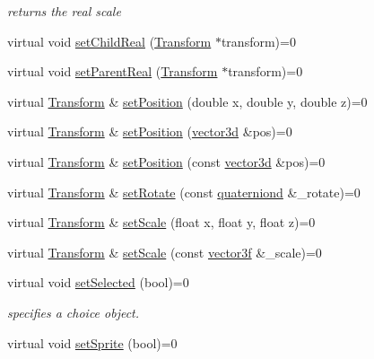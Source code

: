 \begin{DoxyCompactItemize}
\begin{DoxyCompactList}\small\item\em returns the real scale \end{DoxyCompactList}\item 
virtual void \hyperlink{classcsad_1_1_transform_a5fce29724a5e26c3fab77c2546957f9a}{set\-Child\-Real} (\hyperlink{classcsad_1_1_transform}{Transform} $\ast$transform)=0
\item 
virtual void \hyperlink{classcsad_1_1_transform_a4931301d16d9cd801bdfc14c2b0b9dd7}{set\-Parent\-Real} (\hyperlink{classcsad_1_1_transform}{Transform} $\ast$transform)=0
\item 
virtual \hyperlink{classcsad_1_1_transform}{Transform} \& \hyperlink{classcsad_1_1_transform_a8c0308fb4a1103cb8a263edb3d056346}{set\-Position} (double x, double y, double z)=0
\item 
virtual \hyperlink{classcsad_1_1_transform}{Transform} \& \hyperlink{classcsad_1_1_transform_acae94f7cc01c1624c1b92b23038ff73a}{set\-Position} (\hyperlink{classbt_1_1vector3d}{vector3d} \&pos)=0
\item 
virtual \hyperlink{classcsad_1_1_transform}{Transform} \& \hyperlink{classcsad_1_1_transform_af4dfd9ed7eeb7047080f4d3e7bc09bdb}{set\-Position} (const \hyperlink{classbt_1_1vector3d}{vector3d} \&pos)=0
\item 
virtual \hyperlink{classcsad_1_1_transform}{Transform} \& \hyperlink{classcsad_1_1_transform_af7804a2ba14b15d241049156123bd49f}{set\-Rotate} (const \hyperlink{classbt_1_1quaterniond}{quaterniond} \&\-\_\-rotate)=0
\item 
virtual \hyperlink{classcsad_1_1_transform}{Transform} \& \hyperlink{classcsad_1_1_transform_ab6dec9e170dbbea0fae84ff439546e54}{set\-Scale} (float x, float y, float z)=0
\item 
virtual \hyperlink{classcsad_1_1_transform}{Transform} \& \hyperlink{classcsad_1_1_transform_a068d783bb86fa953143a6fb0b4ef95a1}{set\-Scale} (const \hyperlink{classbt_1_1vector3f}{vector3f} \&\-\_\-scale)=0
\item 
\hypertarget{classcsad_1_1_transform_a4369d7af34c97abebb107af66b2a55c3}{virtual void \hyperlink{classcsad_1_1_transform_a4369d7af34c97abebb107af66b2a55c3}{set\-Selected} (bool)=0}\label{classcsad_1_1_transform_a4369d7af34c97abebb107af66b2a55c3}

\begin{DoxyCompactList}\small\item\em specifies a choice object. \end{DoxyCompactList}\item 
\hypertarget{classcsad_1_1_transform_a7b1ec977c3632a2109677b5d4e891b7b}{virtual void \hyperlink{classcsad_1_1_transform_a7b1ec977c3632a2109677b5d4e891b7b}{set\-Sprite} (bool)=0}\label{classcsad_1_1_transform_a7b1ec977c3632a2109677b5d4e891b7b}


\end{DoxyCompactItemize}
